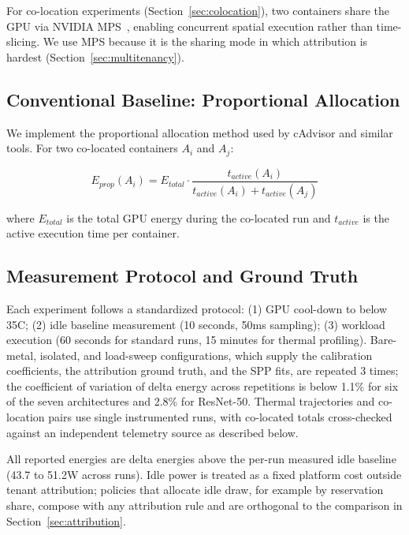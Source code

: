 \documentclass[conference]{IEEEtran}
\begin{document}
For co-location experiments (Section~\ref{sec:colocation}), two containers share the GPU via NVIDIA MPS~\cite{nvidiamps2024}, enabling concurrent spatial execution rather than time-slicing. We use MPS because it is the sharing mode in which attribution is hardest (Section~\ref{sec:multitenancy}).

\subsection{Conventional Baseline: Proportional Allocation}

We implement the proportional allocation method used by cAdvisor and similar tools. For two co-located containers $A_i$ and $A_j$:

\begin{equation}
E_{prop}(A_i) = E_{total} \cdot \frac{t_{active}(A_i)}{t_{active}(A_i) + t_{active}(A_j)}
\label{eq:proportional}
\end{equation}

where $E_{total}$ is the total GPU energy during the co-located run and $t_{active}$ is the active execution time per container.

\subsection{Measurement Protocol and Ground Truth}

Each experiment follows a standardized protocol: (1) GPU cool-down to below 35\textdegree C; (2) idle baseline measurement (10 seconds, 50ms sampling); (3) workload execution (60 seconds for standard runs, 15 minutes for thermal profiling). Bare-metal, isolated, and load-sweep configurations, which supply the calibration coefficients, the attribution ground truth, and the SPP fits, are repeated 3 times; the coefficient of variation of delta energy across repetitions is below 1.1\% for six of the seven architectures and 2.8\% for ResNet-50. Thermal trajectories and co-location pairs use single instrumented runs, with co-located totals cross-checked against an independent telemetry source as described below.

All reported energies are delta energies above the per-run measured idle baseline (43.7 to 51.2W across runs). Idle power is treated as a fixed platform cost outside tenant attribution; policies that allocate idle draw, for example by reservation share, compose with any attribution rule and are orthogonal to the comparison in Section~\ref{sec:attribution}.
\end{document}
